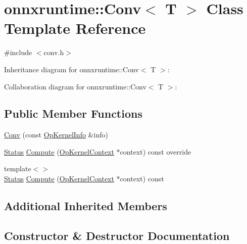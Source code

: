\hypertarget{classonnxruntime_1_1Conv}{}\section{onnxruntime\+:\+:Conv$<$ T $>$ Class Template Reference}
\label{classonnxruntime_1_1Conv}


{\ttfamily \#include $<$conv.\+h$>$}



Inheritance diagram for onnxruntime\+:\+:Conv$<$ T $>$\+:


Collaboration diagram for onnxruntime\+:\+:Conv$<$ T $>$\+:
\subsection*{Public Member Functions}
\begin{DoxyCompactItemize}
\item 
\mbox{\hyperlink{classonnxruntime_1_1Conv_a55a21a4e796836f685b0e680e713e26d}{Conv}} (const \mbox{\hyperlink{classonnxruntime_1_1OpKernelInfo}{Op\+Kernel\+Info}} \&info)
\item 
\mbox{\hyperlink{classonnxruntime_1_1common_1_1Status}{Status}} \mbox{\hyperlink{classonnxruntime_1_1Conv_adb9e3e9c31f9c69cc510b7fb64a56f2e}{Compute}} (\mbox{\hyperlink{classonnxruntime_1_1OpKernelContext}{Op\+Kernel\+Context}} $\ast$context) const override
\item 
{\footnotesize template$<$$>$ }\\\mbox{\hyperlink{classonnxruntime_1_1common_1_1Status}{Status}} \mbox{\hyperlink{classonnxruntime_1_1Conv_a6bce691672e1fff9c2806ecb325b15b6}{Compute}} (\mbox{\hyperlink{classonnxruntime_1_1OpKernelContext}{Op\+Kernel\+Context}} $\ast$context) const
\end{DoxyCompactItemize}
\subsection*{Additional Inherited Members}


\subsection{Constructor \& Destructor Documentation}
\mbox{\label{classonnxruntime_1_1Conv_a55a21a4e796836f685b0e680e713e26d}} 
